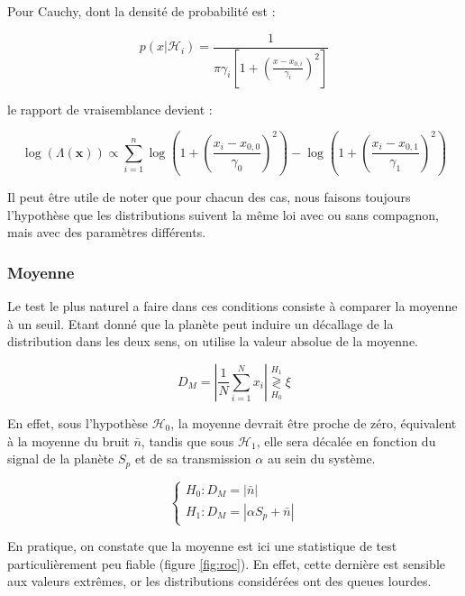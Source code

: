 \documentclass{article}
\begin{document}
Pour Cauchy, dont la densité de probabilité est :

\begin{equation}
    p(x|\mathcal{H}_i) = \frac{1}{\pi \gamma_i \left[1 + \left(\frac{x - x_{0,i}}{\gamma_i}\right)^2\right]}
\end{equation}

le rapport de vraisemblance devient :

\begin{equation}
    \log(\Lambda(\mathbf{x})) \propto \sum_{i=1}^{n} \log\left(1 + \left(\frac{x_i - x_{0,0}}{\gamma_0}\right)^2\right) - \log\left(1 + \left(\frac{x_i - x_{0,1}}{\gamma_1}\right)^2\right)
\end{equation}

Il peut être utile de noter que pour chacun des cas, nous faisons toujours l'hypothèse que les distributions suivent la même loi avec ou sans compagnon, mais avec des paramètres différents.

\subsubsection{Moyenne}

Le test le plus naturel a faire dans ces conditions consiste à comparer la moyenne à un seuil. Etant donné que la planète peut induire un décallage de la distribution dans les deux sens, on utilise la valeur absolue de la moyenne.

$$
D_{M} = \left|\frac{1}{N}\sum_{i=1}^N x_i \right| \stackrel{H_1}{\underset{H_0}{\gtrless}} \xi
$$

En effet, sous l'hypothèse $\mathcal{H}_0$, la moyenne devrait être proche de zéro, équivalent à la moyenne du bruit $\bar{n}$, tandis que sous $\mathcal{H}_1$, elle sera décalée en fonction du signal de la planète $S_p$ et de sa transmission $\alpha$ au sein du système.

$$
\begin{cases}
H_0 : D_M = |\bar{n}|\\
H_1 : D_M =  |\alpha S_p + \bar{n}|
\end{cases}
$$

En pratique, on constate que la moyenne est ici une statistique de test particulièrement peu fiable (figure \ref{fig:roc}). En effet, cette dernière est sensible aux valeurs extrêmes, or les distributions considérées ont des queues lourdes.

\end{document}
